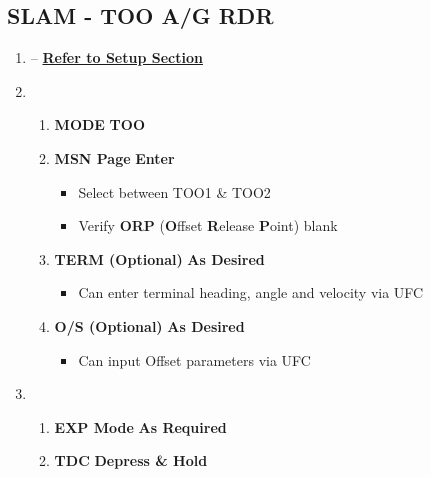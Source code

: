 \documentclass[fontInter]{TechCheck}
\begin{document}

	\clearpage

	\subsection{SLAM - TOO A/G RDR}
	\begin{enumerate}[leftmargin=0.1\textwidth, rightmargin=0.1\textwidth, itemsep=4pt, label=\textbf{\arabic*.}]
		\item {} -- \hyperref[subsec:slamsetup]{\textbf{Refer to Setup Section}}
		\item {}
		\begin{enumerate}[itemsep=4pt]
			\item \textbf{MODE} \dotfill \textbf{TOO}
			\item \textbf{MSN Page} \dotfill \textbf{Enter}
			\begin{itemize}
				\item Select between TOO1 \& TOO2
				\item Verify \textbf{ORP} (\textbf{O}ffset \textbf{R}elease \textbf{P}oint) blank
			\end{itemize}
			\item \textbf{TERM (Optional)} \dotfill \textbf{As Desired}
			\begin{itemize}
				\item Can enter terminal heading, angle and velocity via UFC
			\end{itemize}
			\item \textbf{O/S (Optional)} \dotfill \textbf{As Desired}
			\begin{itemize}
				\item Can input Offset parameters via UFC
			\end{itemize}
		\end{enumerate}
		\item {}
		\begin{enumerate}[itemsep=4pt]
			\item \textbf{EXP Mode} \dotfill \textbf{As Required}
			\item \textbf{TDC} \dotfill \textbf{Depress \& Hold} \\

\end{enumerate}
\end{enumerate}
\end{document}
